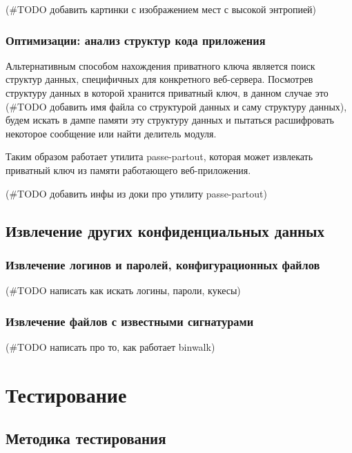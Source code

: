 \documentclass[20pt]{article}
\begin{document}
(\#TODO добавить картинки с изображением мест с высокой энтропией)

\subsubsection{Оптимизации: анализ структур кода приложения}
Альтернативным способом нахождения приватного ключа является поиск структур
данных, специфичных для конкретного веб-сервера. Посмотрев структуру данных в которой
хранится приватный ключ, в данном случае это (\#TODO добавить имя файла со структурой
данных и саму структуру данных), будем искать в дампе памяти эту структуру данных
и пытаться расшифровать некоторое сообщение или найти делитель модуля.

Таким образом работает утилита passe-partout, которая может извлекать приватный ключ из
памяти работающего веб-приложения.

(\#TODO добавить инфы из доки про утилиту passe-partout)

\subsection{Извлечение других конфиденциальных данных}

\subsubsection{Извлечение логинов и паролей, конфигурационных файлов}
(\#TODO написать как искать логины, пароли, кукесы)

\subsubsection{Извлечение файлов с известными сигнатурами}
(\#TODO написать про то, как работает binwalk)

\newpage

\section{Тестирование}

\subsection{Методика тестирования}
\end{document}
